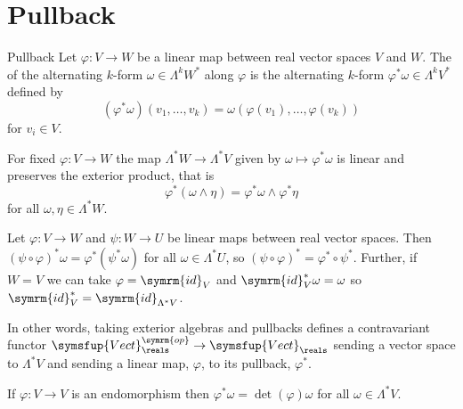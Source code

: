 \documentclass[fleqn]{NotesClass}
\makeatletter
\newcommand{\id}{\symrm{id}}
\newcommand{\c@egory}{\symsfup}
\newcommand{\Vect}[1][\field]{\c@egory{Vect}_{#1}}
\newcommand{\op}{\symrm{op}}
\makeatother
\begin{document}
    \section{Pullback}
    \begin{dfn}{Pullback}{}
        Let \(\varphi \colon V \to W\) be a linear map between real vector spaces \(V\) and \(W\).
        The  of the alternating \(k\)-form \(\omega \in \Lambda^kW^*\) along \(\varphi\) is the alternating \(k\)-form \(\varphi^*\omega \in \Lambda^kV^*\) defined by
        \begin{equation}
            (\varphi^*\omega)(v_1, \dotsc, v_k) = \omega(\varphi(v_1), \dotsc, \varphi(v_k))
        \end{equation}
        for \(v_i \in V\).
    \end{dfn}
    
    \begin{lma}{}{}
        For fixed \(\varphi \colon V \to W\) the map \(\Lambda^* W \to \Lambda^* V\) given by \(\omega \mapsto \varphi^* \omega\) is linear and preserves the exterior product, that is
        \begin{equation}
            \varphi^*(\omega \wedge \eta) = \varphi^*\omega \wedge \varphi^*\eta
        \end{equation}
        for all \(\omega, \eta \in \Lambda^*W\).
   \end{lma}
   \begin{lma}{}{}
        Let \(\varphi \colon V \to W\) and \(\psi \colon W \to U\) be linear maps between real vector spaces.
        Then \((\psi \circ \varphi)^*\omega = \varphi^*(\psi^*\omega)\) for all \(\omega \in \Lambda^*U\), so \((\psi \circ \varphi)^* = \varphi^* \circ \psi^*\).
        Further, if \(W = V\) we can take \(\varphi = \id_V\) and \(\id_V^*\omega = \omega\) so \(\id_V^* = \id_{\Lambda^*V}\).
        
        In other words, taking exterior algebras and pullbacks defines a contravariant functor \(\Vect[\reals]^{\op} \to \Vect[\reals]\) sending a vector space to \(\Lambda^* V\) and sending a linear map, \(\varphi\), to its pullback, \(\varphi^*\).
    \end{lma}
    
    \begin{lma}{}{}
        If \(\varphi \colon V \to V\) is an endomorphism then \(\varphi^*\omega = \det(\varphi) \omega\) for all \(\omega \in \Lambda^* V\).
    \end{lma}
    
    
%        
%
\end{document}
